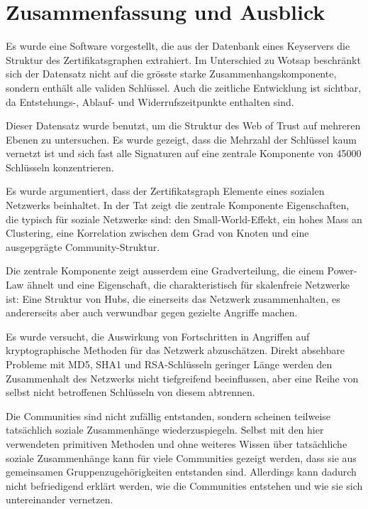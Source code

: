 
\chapter{Zusammenfassung und Ausblick}
\label{ch:Zusammenfassung}

Es wurde eine Software vorgestellt, die aus der Datenbank eines
Keyservers die Struktur des Zertifikatsgraphen extrahiert. Im
Unterschied zu Wotsap beschr\"ankt sich der Datensatz nicht auf die
gr\"osste starke Zusammenhangskomponente, sondern enth\"alt alle
validen Schl\"ussel. Auch die zeitliche Entwicklung ist sichtbar, da
Entstehungs-, Ablauf- und Widerrufszeitpunkte enthalten sind.

Dieser Datensatz wurde benutzt, um die Struktur des Web of Trust auf
mehreren Ebenen zu untersuchen. Es wurde gezeigt, dass die Mehrzahl
der Schl\"ussel kaum vernetzt ist und sich fast alle Signaturen auf
eine zentrale Komponente von 45000 Schl\"usseln konzentrieren. 

Es wurde argumentiert, dass der Zertifikatsgraph Elemente eines
sozialen Netzwerks beinhaltet. In der Tat zeigt die zentrale
Komponente Eigenschaften, die typisch f\"ur soziale Netzwerke sind:
den Small-World-Effekt, ein hohes Mass an Clustering, eine Korrelation
zwischen dem Grad von Knoten und eine ausgepgr\"agte
Community-Struktur.

Die zentrale Komponente zeigt ausserdem eine Gradverteilung, die einem
Power-Law \"ahnelt und eine Eigenschaft, die charakteristisch f\"ur
skalenfreie Netzwerke ist: Eine Struktur von Hubs, die einerseits das
Netzwerk zusammenhalten, es andererseits aber auch verwundbar gegen
gezielte Angriffe machen. 

Es wurde versucht, die Auswirkung von Fortschritten in Angriffen auf
kryptographische Methoden f\"ur das Netzwerk abzusch\"atzen. Direkt
absehbare Probleme mit MD5, SHA1 und RSA-Schl\"usseln geringer L\"ange
werden den Zusammenhalt des Netzwerks nicht tiefgreifend beeinflussen,
aber eine Reihe von selbst nicht betroffenen Schl\"usseln von diesem
abtrennen.

Die Communities sind nicht zuf\"allig entstanden, sondern scheinen
teilweise tats\"achlich soziale Zusammenh\"ange
wiederzuspiegeln. Selbst mit den hier verwendeten primitiven Methoden
und ohne weiteres Wissen \"uber tats\"achliche soziale Zusammenh\"ange
kann f\"ur viele Communities gezeigt werden, dass sie aus gemeinsamen
Gruppenzugeh\"origkeiten entstanden sind. Allerdings kann dadurch
nicht befriedigend erkl\"art werden, wie die Communities entstehen
und wie sie sich untereinander vernetzen.

